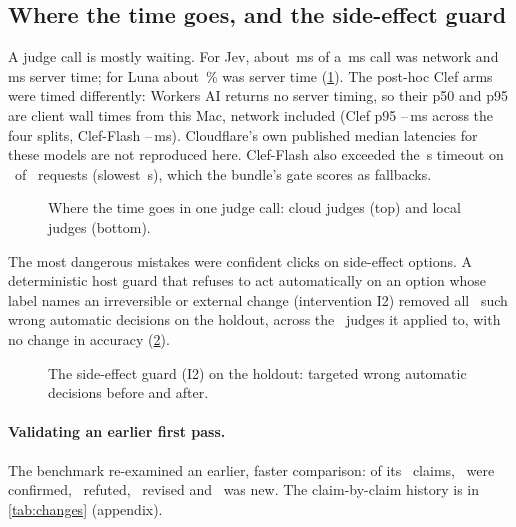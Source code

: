 \subsection{Where the time goes, and the side-effect guard}

A judge call is mostly waiting. For Jev, about \LatJevNetwork\,ms of a \LatJevWall\,ms call was network and
\LatJevServer\,ms server time; for Luna about \LatLunaServerShare\,\% was server time
(\cref{fig:jblatency}). The post-hoc Clef arms were timed differently: Workers AI returns no server timing, so their
p50 and p95 are client wall times from this Mac, network included (Clef p95 \ClClefPninetyfiveLow--\ClClefPninetyfiveHigh\,ms
across the four splits, Clef-Flash \ClFlashPninetyfiveLow--\ClFlashPninetyfiveHigh\,ms). Cloudflare's own published
median latencies for these models are not reproduced here. Clef-Flash also exceeded the \ClTimeoutS\,s timeout on
\ClFlashSlow\ of \ClFlashRequests\ requests (slowest \ClSlowest\,s), which the bundle's gate scores as fallbacks.

\begin{figure}[htbp]
\centering

\caption{Where the time goes in one judge call: cloud judges (top) and local judges (bottom).}
\label{fig:jblatency}
\end{figure}

The most dangerous mistakes were confident clicks on side-effect options. A deterministic host guard that
refuses to act automatically on an option whose label names an irreversible or external change (intervention
I2) removed all \ITwoHoldBefore\ such wrong automatic decisions on the holdout, across the
\ITwoHoldNApplicable\ judges it applied to, with no change in accuracy (\cref{fig:jbi2}).

\begin{figure}[htbp]
\centering

\caption{The side-effect guard (I2) on the holdout: targeted wrong automatic decisions before and after.}
\label{fig:jbi2}
\end{figure}

\paragraph{Validating an earlier first pass.} The benchmark re-examined an earlier, faster comparison: of its
\ChangesN\ claims, \ChangesConfirmed\ were confirmed, \ChangesRefuted\ refuted, \ChangesRevised\ revised and
\ChangesNew\ was new. The claim-by-claim history is in \cref{tab:changes} (appendix).

